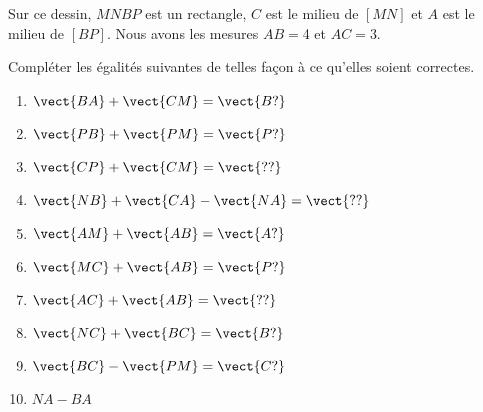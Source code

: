 
\begin{exercice}\label{exosmath-0221}

        Sur ce dessin, \( MNBP\) est un rectangle, \( C\) est le milieu de \( [MN]\) et $A$ est le milieu de \( [BP]\). Nous avons les mesures \( AB=\)\unit{4}{\centi\meter} et \( AC=\)\unit{3}{\centi\meter}.

    \begin{center}

    \end{center}

    Compléter les égalités suivantes de telles façon à ce qu'elles soient correctes.
    \begin{multicols}{2}
        \begin{enumerate}
            \item
                \( \vect{ BA }+\vect{ CM }=\vect{ B? }\) 
            \item
                \( \vect{ PB }+\vect{ PM }=\vect{ P? }\)
            \item
                \( \vect{ CP }+\vect{ CM }=\vect{ ?? }\)
            \item
                \( \vect{ NB }+\vect{ CA }-\vect{ NA }=\vect{ ?? }\)
            \item
                \( \vect{ AM }+\vect{ AB }=\vect{ A? }\)
            \item
                \( \vect{ MC }+\vect{ AB }=\vect{ P? }\)
            \item
                \( \vect{ AC }+\vect{ AB }=\vect{ ?? }\)
            \item
                \( \vect{ NC }+\vect{ BC }=\vect{ B? }\)
            \item
                \( \vect{ BC }-\vect{ PM }=\vect{ C? }\)
            \item
                \( NA-BA\)
        \end{enumerate}
    \end{multicols}

\end{exercice}
